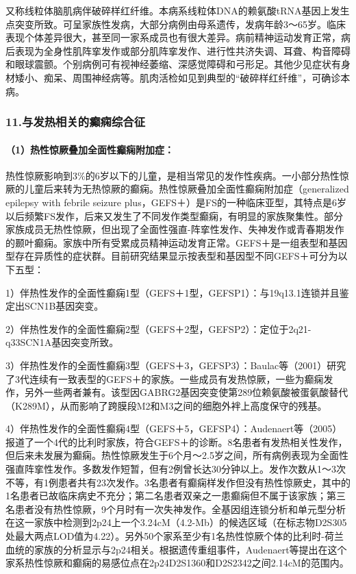 又称线粒体脑肌病伴破碎样红纤维。本病系线粒体DNA的赖氨酸tRNA基因上发生点突变所致。可呈家族性发病，大部分病例由母系遗传，发病年龄3～65岁。临床表现个体差异很大，甚至同一家系成员也有很大差异。病前精神运动发育正常，病后表现为全身性肌阵挛发作或部分肌阵挛发作、进行性共济失调、耳聋、构音障碍和眼球震颤。个别病例可有视神经萎缩、深感觉障碍和弓形足。其他少见症状有身材矮小、痴呆、周围神经病等。肌肉活检如见到典型的“破碎样红纤维”，可确诊本病。

\subsubsection{11.与发热相关的癫痫综合征}

\paragraph{（1）热性惊厥叠加全面性癫痫附加症：}

热性惊厥影响到3\%的6岁以下的儿童，是相当常见的发作性疾病。一小部分热性惊厥的儿童后来转为无热惊厥的癫痫。热性惊厥叠加全面性癫痫附加症（generalized
epilepsy with febrile seizure
plus，GEFS＋）是FS的一种临床亚型，其特点是6岁以后频繁FS发作，后来又发生了不同发作类型癫痫，有明显的家族聚集性。部分家族成员无热性惊厥，但出现了全面性强直-阵挛性发作、失神发作或青春期发作的颞叶癫痫。家族中所有受累成员精神运动发育正常。GEFS＋是一组表型和基因型存在异质性的症状群。目前研究结果显示按表型和基因型不同GEFS＋可分为以下五型：

1）伴热性发作的全面性癫痫1型（GEFS＋1型，GEFSP1）：与19q13.1连锁并且鉴定出SCN1B基因突变。

2）伴热性发作的全面性癫痫2型（GEFS＋2型，GEFSP2）：定位于2q21-q33SCN1A基因突变所致。

3）伴热性发作的全面性癫痫3型（GEFS＋3，GEFSP3）：Baulac等（2001）研究了3代连续有一致表型的GEFS＋的家族。一些成员有发热惊厥，一些为癫痫发作，另外一些两者兼有。该型因GABRG2基因突变使第289位赖氨酸被蛋氨酸替代（K289M），从而影响了跨膜段M2和M3之间的细胞外袢上高度保守的残基。

4）伴热性发作的全面性癫痫4型（GEFS＋5，GEFSP4）：Audenaert等（2005）报道了一个4代的比利时家族，符合GEFS＋的诊断。8名患者有发热相关性发作，但后来未发展为癫痫。热性惊厥发生于6个月～2.5岁之间，所有病例表现为全面性强直阵挛性发作。多数发作短暂，但有2例曾长达30分钟以上。发作次数从1～3次不等，有1例患者共有23次发作。3名患者有癫痫样发作但没有热性惊厥史，其中的1名患者已故临床病史不充分；第二名患者双亲之一患癫痫但不属于该家族；第三名患者没有热性惊厥，9个月时有一次失神发作。全基因组连锁分析和单元型分析在这一家族中检测到2p24上一个3.24cM（4.2-Mb）的候选区域（在标志物D2S305处最大两点LOD值为4.22）。另外50个家系至少有1名热性惊厥个体的比利时-荷兰血统的家族的分析显示与2p24相关。根据遗传重组事件，Audenaert等提出在这个家系热性惊厥和癫痫的易感位点在2p24D2S1360和D2S2342之间2.14cM的范围内。

